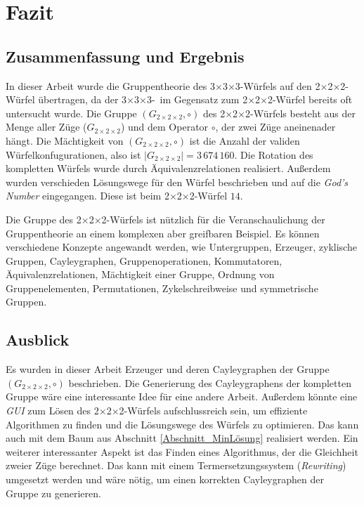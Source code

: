 \documentclass[12pt,a4paper, usenames, dvipsnames]{article}
\theoremstyle{mystyle}
\theoremstyle{definition}
\newcommand{\Gtwo}{\ensuremath{G_{2\times 2\times 2}}}
\newcommand{\Ttwo}{2$\times$2$\times$2-}
\newcommand{\Tthree}{3$\times$3$\times$3-}
\begin{document}
%
%
%
%
%
%
%
%
%
%
%
%
%
%
%
%
%
%

\newpage
\section{Fazit}

\label{Kapitel_Fazit}


%
%
%
%
%
%
%
%
%
%
%
%
%
%
%
%
%
%
%
%
\subsection{Zusammenfassung und Ergebnis}

In dieser Arbeit wurde die Gruppentheorie des \Tthree Würfels auf den \Ttwo Würfel übertragen, da der \Tthree \ im Gegensatz zum \Ttwo Würfel bereits oft untersucht wurde. Die Gruppe $(\Gtwo, \circ)$ des \Ttwo Würfels besteht aus der Menge aller Züge ($\Gtwo$) und dem Operator $\circ$, der zwei Züge aneinenader hängt. Die Mächtigkeit von $(\Gtwo, \circ)$ ist die Anzahl der validen Würfelkonfugurationen, also ist $|\Gtwo| = 3 \, 674 \, 160$. Die Rotation des kompletten Würfels wurde durch Äquivalenzrelationen realisiert. Außerdem wurden verschieden Lösungswege für den Würfel beschrieben und auf die \textit{God's Number} eingegangen. Diese ist beim \Ttwo Würfel $14$.

Die Gruppe des \Ttwo Würfels ist nützlich für die Veranschaulichung der Gruppentheorie an einem komplexen aber greifbaren Beispiel. Es können verschiedene Konzepte angewandt werden, wie Untergruppen, Erzeuger, zyklische Gruppen, Cayleygraphen, Gruppenoperationen, Kommutatoren, Äquivalenzrelationen, Mächtigkeit einer Gruppe, Ordnung von Gruppenelementen, Permutationen, Zykelschreibweise und symmetrische Gruppen.

%
%
%
%
%
%
%
%
%
%
%
%
%
%
%
%
%
%
%
\subsection{Ausblick}

Es wurden in dieser Arbeit Erzeuger und deren Cayleygraphen der Gruppe $(\Gtwo, \circ)$ beschrieben. Die Generierung des Cayleygraphens der kompletten Gruppe wäre eine interessante Idee für eine andere Arbeit. Außerdem könnte eine \textit{GUI} zum Lösen des \Ttwo Würfels aufschlussreich sein, um effiziente Algorithmen zu finden und die Lösungswege des Würfels zu optimieren. Das kann auch mit dem Baum aus Abschnitt \ref{Abschnitt_MinLösung} realisiert werden.
Ein weiterer interessanter Aspekt ist das Finden eines Algorithmus, der die Gleichheit zweier Züge berechnet. Das kann mit einem Termersetzungssystem (\textit{Rewriting}) umgesetzt werden und wäre nötig, um einen korrekten Cayleygraphen der Gruppe zu generieren.
\end{document}

